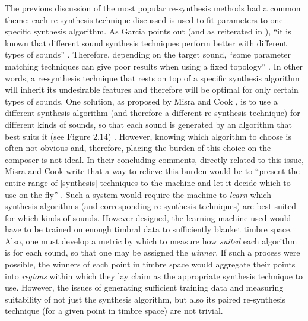 \documentclass[a4paper,12pt]{report} 	%
\numberwithin{figure}{chapter}
\numberwithin{table}{chapter}
\numberwithin{equation}{chapter}
\begin{document}
\begin{flushleft}
The previous discussion of the most popular re-synthesis methods had a common theme: each re-synthesis technique discussed is used to fit parameters to one specific synthesis algorithm. As Garcia points out (and as reiterated in \cite[p. 103]{Tolonen:1998bh}), ``it is known that different sound synthesis techniques perform better with different types of sounds'' \cite[p. 1]{Garcia:2001jw}. Therefore, depending on the target sound, ``some parameter matching techniques can give poor results when using a fixed topology'' \cite[p. 1]{Garcia:2000th}. In other words, a re-synthesis technique that rests on top of a specific synthesis algorithm will inherit its undesirable features and therefore will be optimal for only certain types of sounds. One solution, as proposed by Misra and Cook \cite{Misra:2009km}, is to use a different synthesis algorithm (and therefore a different re-synthesis technique) for different kinds of sounds, so that each sound is generated by an algorithm that best suits it (see Figure 2.14) \cite[p. 1]{Misra:2009km}. However, knowing which algorithm to choose is often not obvious and, therefore, placing the burden of this choice on the composer is not ideal. In their concluding comments, directly related to this issue, Misra and Cook write that a way to relieve this burden would be to ``present the entire range of [synthesis] techniques to the machine and let it decide which to use on-the-fly''  \cite[p. 5]{Misra:2009km}. Such a system would require the machine to \emph{learn} which synthesis algorithms (and corresponding re-synthesis techniques) are best suited for which kinds of sounds. However designed, the learning machine used would have to be trained on enough timbral data to sufficiently blanket timbre space. Also, one must develop a metric by which to measure how \emph{suited} each algorithm is for each sound, so that one may be assigned the \emph{winner}. If such a process were possible, the winners of each point in timbre space would aggregate their points into \emph{regions} within which they lay claim as the appropriate synthesis technique to use. However, the issues of generating sufficient training data and measuring suitability of not just the synthesis algorithm, but also its paired re-synthesis technique (for a given point in timbre space) are not trivial.
\\
\begin{figure}[h!]
\begin{center}

\end{center}
\end{figure}
\end{flushleft}
\end{document}
